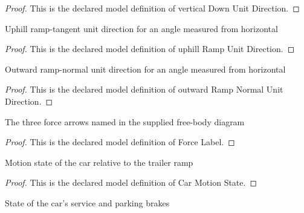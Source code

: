 \begin{proof}
  This is the declared model definition of vertical Down Unit Direction.
\end{proof}
\begin{definition}
  \label{def:physics:phyx-mini-0799:phyxminiproblems-problemphyxmini0799-uphillrampunitdirection}
  Uphill ramp-tangent unit direction for an angle measured from horizontal
\end{definition}
\begin{proof}
  This is the declared model definition of uphill Ramp Unit Direction.
\end{proof}
\begin{definition}
  \label{def:physics:phyx-mini-0799:phyxminiproblems-problemphyxmini0799-outwardrampnormalunitdirection}
  Outward ramp-normal unit direction for an angle measured from horizontal
\end{definition}
\begin{proof}
  This is the declared model definition of outward Ramp Normal Unit Direction.
\end{proof}
\begin{definition}
  \label{def:physics:phyx-mini-0799:phyxminiproblems-problemphyxmini0799-forcelabel}
  The three force arrows named in the supplied free-body diagram
\end{definition}
\begin{proof}
  This is the declared model definition of Force Label.
\end{proof}
\begin{definition}
  \label{def:physics:phyx-mini-0799:phyxminiproblems-problemphyxmini0799-carmotionstate}
  Motion state of the car relative to the trailer ramp
\end{definition}
\begin{proof}
  This is the declared model definition of Car Motion State.
\end{proof}
\begin{definition}
  \label{def:physics:phyx-mini-0799:phyxminiproblems-problemphyxmini0799-brakestate}
  State of the car's service and parking brakes
\end{definition}
